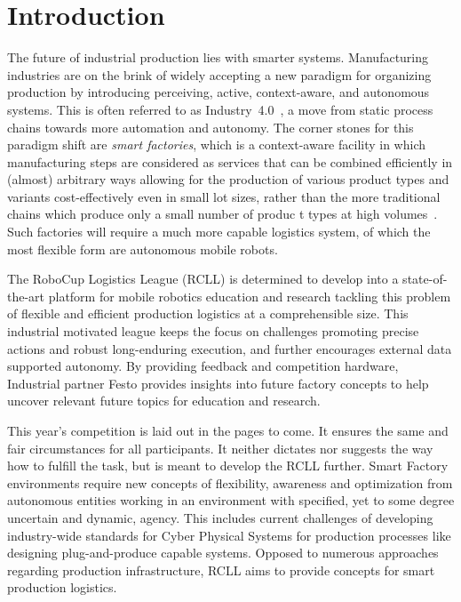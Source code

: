 \documentclass[12pt,twoside]{article}
\begin{document}
\section{Introduction}
\label{sec:intro}
The future of industrial production lies with smarter
systems. Manufacturing industries are on the brink of widely accepting
a new paradigm for organizing production by introducing perceiving,
active, context-aware, and autonomous systems. This is often referred
to as Industry~4.0~\cite{Industry-4.0}, a move from static process
chains towards more automation and autonomy. The corner stones for
this paradigm shift are \emph{smart factories}, which is a
context-aware facility in which manufacturing steps are considered as
services that can be combined efficiently in (almost) arbitrary ways
allowing for the production of various product types and variants
cost-effectively even in small lot sizes, rather than the more
traditional chains which produce only a small number of produc
t types
at high volumes~\cite{RCLL-CPS}. Such factories will require a much
more capable logistics system, of which the most flexible form are
autonomous mobile robots.

The RoboCup Logistics League (RCLL) is determined to develop into a
state-of-the-art platform for mobile robotics education and research
tackling this problem of flexible and efficient production logistics at a
comprehensible size. This industrial motivated league keeps the focus
on challenges promoting precise actions and robust long-enduring
execution, and further encourages external data supported
autonomy. By providing feedback and competition hardware, Industrial 
partner Festo provides insights into future factory concepts to help
 uncover relevant future topics for education and research.

 This year's competition is laid out in the pages to come.  It ensures
 the same and fair circumstances for all participants. It neither
 dictates nor suggests the way how to fulfill the task, but is meant
 to develop the RCLL further. Smart Factory environments require new
 concepts of flexibility, awareness and optimization from autonomous
 entities working in an environment with specified, yet to some degree
 uncertain and dynamic, agency. This includes current challenges of
 developing industry-wide standards for Cyber Physical Systems for
 production processes like designing plug-and-produce capable
 systems. Opposed to numerous approaches regarding production
 infrastructure, RCLL aims to provide concepts for smart production
 logistics.
 	
\end{document}
